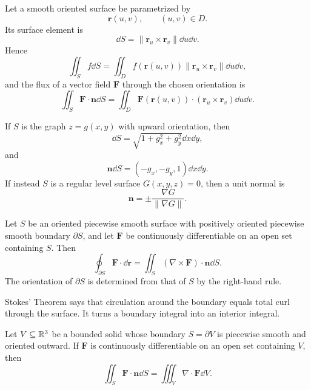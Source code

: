     \begin{definition}
        Let a smooth oriented surface be parametrized by
        \[
            \mathbf{r}(u,v),
            \qquad
            (u,v)\in D.
        \]
        Its surface element is
        \[
            \dd S
            =
            \|\mathbf{r}_u\times\mathbf{r}_v\|\dd u\dd v.
        \]
        Hence
        \[
            \iint_S f\dd S
            =
            \iint_D
            f(\mathbf{r}(u,v))
            \|\mathbf{r}_u\times\mathbf{r}_v\|\dd u\dd v,
        \]
        and the flux of a vector field $\mathbf{F}$ through the chosen
        orientation is
        \[
            \iint_S\mathbf{F}\cdot\mathbf{n}\dd S
            =
            \iint_D
            \mathbf{F}(\mathbf{r}(u,v))
            \cdot
            (\mathbf{r}_u\times\mathbf{r}_v)\dd u\dd v.
        \]

        If $S$ is the graph $z=g(x,y)$ with upward orientation, then
        \[
            \dd S
            =
            \sqrt{1+g_x^2+g_y^2}\dd x\dd y,
        \]
        and
        \[
            \mathbf{n}\dd S
            =
            (-g_x,-g_y,1)\dd x\dd y.
        \]
        If instead $S$ is a regular level surface
        $G(x,y,z)=0$, then a unit normal is
        \[
            \mathbf{n}
            =
            \pm\frac{\nabla G}{\|\nabla G\|}.
        \]
    \end{definition}

    \begin{theorem}
        Let $S$ be an oriented piecewise smooth surface with positively oriented
        piecewise smooth boundary $\partial S$, and let $\mathbf{F}$ be
        continuously differentiable on an open set containing $S$. Then
        \[
            \oint_{\partial S}\mathbf{F}\cdot\dd\mathbf{r}
            =
            \iint_S(\nabla\times\mathbf{F})\cdot\mathbf{n}\dd S.
        \]
        The orientation of $\partial S$ is determined from that of $S$ by the
        right-hand rule.
    \end{theorem}

    \begin{idea}
        Stokes' Theorem says that circulation around the boundary equals total
        curl through the surface. It turns a boundary integral into an interior
        integral.
    \end{idea}

    \begin{theorem}
        Let $V\subseteq\mathbb{R}^3$ be a bounded solid whose boundary
        $S=\partial V$ is piecewise smooth and oriented outward. If
        $\mathbf{F}$ is continuously differentiable on an open set containing
        $V$, then
        \[
            \iint_S\mathbf{F}\cdot\mathbf{n}\dd S
            =
            \iiint_V\nabla\cdot\mathbf{F}\dd V.
        \]
    \end{theorem}

